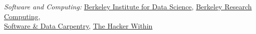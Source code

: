 \textit{Software and Computing:} \href{http://bids.berkeley.edu/}{Berkeley Institute for Data Science}, \href{http://research-it.berkeley.edu/programs/berkeley-research-computing}{Berkeley Research Computing}, \\
 \hspace*{1em} \href{http://software-carpentry.org/}{Software \& Data Carpentry}, \href{http://thehackerwithin.github.io/berkeley/}{The Hacker Within} 
%
%
%
%
%
%

